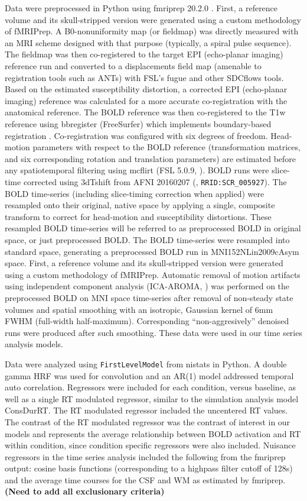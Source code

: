 \documentclass[titlepage,12pt] {article}
\begin{document}
Data were preprocessed in Python using fmriprep 20.2.0 \citep{esteban2019}.  First, a reference volume and its skull-stripped version were generated using a custom methodology of fMRIPrep. A B0-nonuniformity map (or fieldmap) was directly measured with an MRI scheme designed with that purpose (typically, a spiral pulse sequence). The fieldmap was then co-registered to the target EPI (echo-planar imaging) reference run and converted to a displacements field map (amenable to registration tools such as ANTs) with FSL’s fugue and other SDCflows tools. Based on the estimated susceptibility distortion, a corrected EPI (echo-planar imaging) reference was calculated for a more accurate co-registration with the anatomical reference. The BOLD reference was then co-registered to the T1w reference using bbregister (FreeSurfer) which implements boundary-based registration \citep{greve2009}. Co-registration was configured with six degrees of freedom. Head-motion parameters with respect to the BOLD reference (transformation matrices, and six corresponding rotation and translation parameters) are estimated before any spatiotemporal filtering using mcflirt (FSL 5.0.9, \citet{jenkinson2002}). BOLD runs were slice-time corrected using 3dTshift from AFNI 20160207 (\citet{cox1997}, \verb+RRID:SCR_005927+). The BOLD time-series (including slice-timing correction when applied) were resampled onto their original, native space by applying a single, composite transform to correct for head-motion and susceptibility distortions. These resampled BOLD time-series will be referred to as preprocessed BOLD in original space, or just preprocessed BOLD. The BOLD time-series were resampled into standard space, generating a preprocessed BOLD run in MNI152NLin2009cAsym space. First, a reference volume and its skull-stripped version were generated using a custom methodology of fMRIPrep. Automatic removal of motion artifacts using independent component analysis (ICA-AROMA, \citet{pruim2015}) was performed on the preprocessed BOLD on MNI space time-series after removal of non-steady state volumes and spatial smoothing with an isotropic, Gaussian kernel of 6mm FWHM (full-width half-maximum). Corresponding “non-aggresively” denoised runs were produced after such smoothing.  These data were used in our time series analysis models.


Data were analyzed using \verb+FirstLevelModel+ from nistats in Python.  A double gamma HRF was used for convolution and an AR(1) model addressed temporal auto correlation.  Regressors were included for each condition, versus baseline, as well as a single RT modulated regressor, similar to the simulation analysis model ConsDurRT.  The RT modulated regressor included the uncentered RT values.  The contrast of the RT modulated regressor was the contrast of interest in our models and represents the average relationship between BOLD activation and RT within condition, since condition specific regressors were also included.  Nuisance regressors in the time series analysis included the following from the fmriprep output: cosine basis functions (corresponding to a highpass filter cutoff of 128s) and the average time courses for the CSF and WM as estimated by fmriprep. \textbf{(Need to add all exclusionary criteria)}
\end{document}
